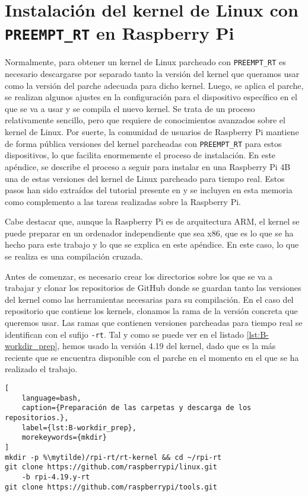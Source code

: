 \chapter{Instalación del kernel de Linux con \texttt{PREEMPT\_RT} en Raspberry Pi}
\label{app:B-rt_raspi}

Normalmente, para obtener un kernel de Linux parcheado con \texttt{PREEMPT\_RT}
es necesario descargarse por separado tanto la versión del kernel que queramos
usar como la versión del parche adecuada para dicho kernel. Luego, se aplica el
parche, se realizan algunos ajustes en la configuración para el dispositivo
específico en el que se va a usar y se compila el nuevo kernel. Se trata de un
proceso relativamente sencillo, pero que requiere de conocimientos avanzados
sobre el kernel de Linux. Por suerte, la comunidad de usuarios de Raspberry Pi
mantiene  de forma pública versiones del kernel parcheadas con
\texttt{PREEMPT\_RT} para estos dispositivos, lo que facilita enormemente el
proceso de instalación. En este apéndice, se describe el proceso a seguir para
instalar en una Raspberry Pi 4B una de estas versiones del kernel de Linux
parcheado para tiempo real. Estos pasos han sido extraídos del tutorial presente
en \cite{noauthor_raspberry_nodate} y se incluyen en esta memoria como
complemento a las tareas realizadas sobre la Raspberry Pi.

Cabe destacar que, aunque la Raspberry Pi es de arquitectura ARM, el kernel se
puede preparar en un ordenador independiente que sea x86, que es lo que se ha
hecho para este trabajo y lo que se explica en este apéndice. En este caso, lo
que se realiza es una compilación cruzada.

Antes de comenzar, es necesario crear los directorios sobre los que se va a
trabajar y clonar los repositorios de GitHub donde se guardan tanto las
versiones del kernel como las herramientas necesarias para su compilación. En el
caso del repositorio que contiene los kernels, clonamos la rama de la versión
concreta que queremos usar. Las ramas que contienen versiones parcheadas para
tiempo real se identifican con el sufijo \texttt{-rt}. Tal y como se puede ver
en el listado \ref{lst:B-workdir_prep}, hemos usado la versión 4.19 del kernel,
dado que es la más reciente que se encuentra disponible con el parche en el
momento en el que se ha realizado el trabajo.

\begin{lstlisting}[
    language=bash,
    caption={Preparación de las carpetas y descarga de los repositorios.},
    label={lst:B-workdir_prep},
    morekeywords={mkdir}
]
mkdir -p %\mytilde)/rpi-rt/rt-kernel && cd ~/rpi-rt
git clone https://github.com/raspberrypi/linux.git 
    -b rpi-4.19.y-rt
git clone https://github.com/raspberrypi/tools.git
\end{lstlisting}

